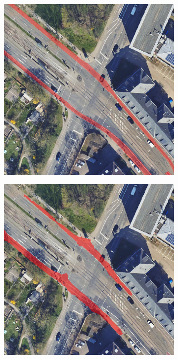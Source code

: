 \begin{figure}
	\centering
	\begin{subfigure}{.45\textwidth}
		\centering
		\includegraphics[width=1.\linewidth]{Bilder/annotation-mistake/overlayed.png}
		\caption{}
	\end{subfigure}
	\begin{subfigure}{.45\textwidth}
		\centering
		\includegraphics[width=1.\linewidth]{Bilder/annotation-mistake/straight-dbunet-r.png}

\end{subfigure}
\end{figure}
